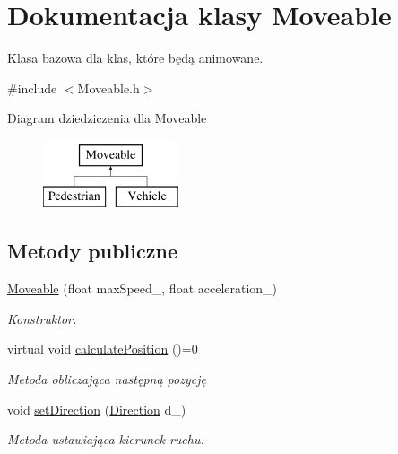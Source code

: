 \hypertarget{class_moveable}{\section{Dokumentacja klasy Moveable}
\label{class_moveable}
}


Klasa bazowa dla klas, które będą animowane.  




{\ttfamily \#include $<$Moveable.\-h$>$}

Diagram dziedziczenia dla Moveable\begin{figure}[H]
\begin{center}
\leavevmode
\includegraphics[height=2.000000cm]{class_moveable}
\end{center}
\end{figure}
\subsection*{Metody publiczne}
\begin{DoxyCompactItemize}
\item 
\hyperlink{class_moveable_ac76fdea840225276961ac42ba23e096e}{Moveable} (float max\-Speed\-\_\-, float acceleration\-\_\-)
\begin{DoxyCompactList}\small\item\em Konstruktor. \end{DoxyCompactList}\item 
virtual void \hyperlink{class_moveable_a3e42cec7b55d6320553b1c40e2392cb9}{calculate\-Position} ()=0
\begin{DoxyCompactList}\small\item\em Metoda obliczająca następną pozycję \end{DoxyCompactList}\item 
void \hyperlink{class_moveable_aa34a08ea960f6a48e1239861ba1442a1}{set\-Direction} (\hyperlink{_direction_8h_a224b9163917ac32fc95a60d8c1eec3aa}{Direction} d\-\_\-)
\begin{DoxyCompactList}\small\item\em Metoda ustawiająca kierunek ruchu. \end{DoxyCompactList}\end{DoxyCompactItemize}
